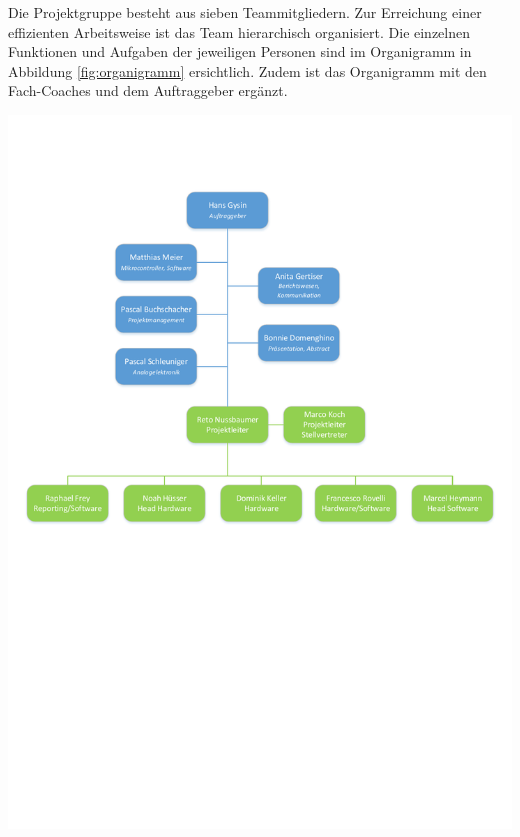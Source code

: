 Die  Projektgruppe besteht  aus sieben  Teammitgliedern. Zur Erreichung  einer
effizienten Arbeitsweise ist das  Team hierarchisch organisiert. Die einzelnen
Funktionen  und  Aufgaben  der  jeweiligen Personen  sind  im  Organigramm  in
Abbildung \ref{fig:organigramm} ersichtlich. Zudem ist das Organigramm mit den
Fach-Coaches und dem Auftraggeber erg\"anzt.


{\centering
    \includegraphics[width=175mm,clip=true,trim=0mm 125mm 0mm 10mm]{images/organigramm.pdf} \\
    \label{fig:organigramm}
}
